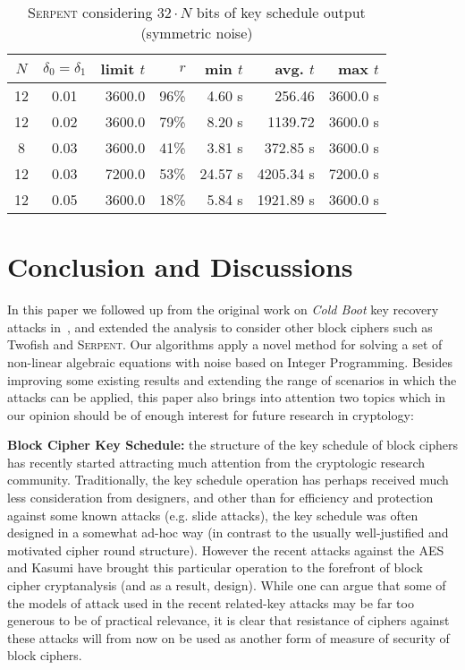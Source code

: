 \documentclass{llncs}
\newcommand{\Serpent}{\textsc{Serpent}\xspace}
\newcommand{\coldboot}{\emph{Cold Boot}\xspace}
\begin{document}
\begin{table}
\begin{center}
\begin{tabular}{|c|c|r|r|r|r|r|}
\hline
$N$ & $\delta_0  = \delta_1$ & limit $t$ & $r$ & min $t$ & avg. $t$ & max $t$\\
\hline
12 & 0.01 & 3600.0 & 96\% & 4.60 s & 256.46 & 3600.0 s \\%
\hline
12 & 0.02 & 3600.0 & 79\% & 8.20 s & 1139.72 & 3600.0 s \\%
\hline
 8 & 0.03 & 3600.0 & 41\% & 3.81 s & 372.85 s & 3600.0 s \\%
\hline
12 & 0.03 & 7200.0 & 53\% & 24.57 s & 4205.34 s & 7200.0 s \\%
\hline
12 & 0.05 & 3600.0 & 18\% & 5.84 s & 1921.89 s & 3600.0 s \\%
\hline
\end{tabular}
\end{center}
\caption{\Serpent considering $32 \cdot N$ bits of key schedule output (symmetric noise)}
\label{tab:serpent-sym}
\end{table}

\section{Conclusion and Discussions}
\label{sec:conclusion}

In this paper we followed up from the original work on \coldboot key recovery attacks in~\cite{coldboot,aes-sat,tsow}, and extended the analysis to consider other block ciphers such as Twofish and \Serpent. Our algorithms apply a novel method for solving a set of non-linear algebraic equations with noise based on Integer Programming. Besides improving some existing results and extending the range of scenarios in which the attacks can be applied, this paper also brings into attention two topics which in our opinion should be of enough interest for future research in cryptology:

{\bf Block Cipher Key Schedule: } the structure of the key schedule of block ciphers has recently started attracting much attention from the cryptologic research community. Traditionally, the key schedule operation has perhaps received much less consideration from designers, and other than for efficiency and protection against some known attacks (e.g. slide attacks),  the key schedule was often designed in a somewhat ad-hoc way (in contrast to the usually well-justified and motivated cipher round structure).  However the recent attacks against the AES and Kasumi have brought this particular operation to the forefront of block cipher cryptanalysis (and as a result, design). While one can argue that some of the models of attack used in the recent related-key attacks may be far too generous to be of practical relevance, it is clear that resistance of ciphers against these attacks will from now on be used as another form of measure of security of block ciphers.
\end{document}
